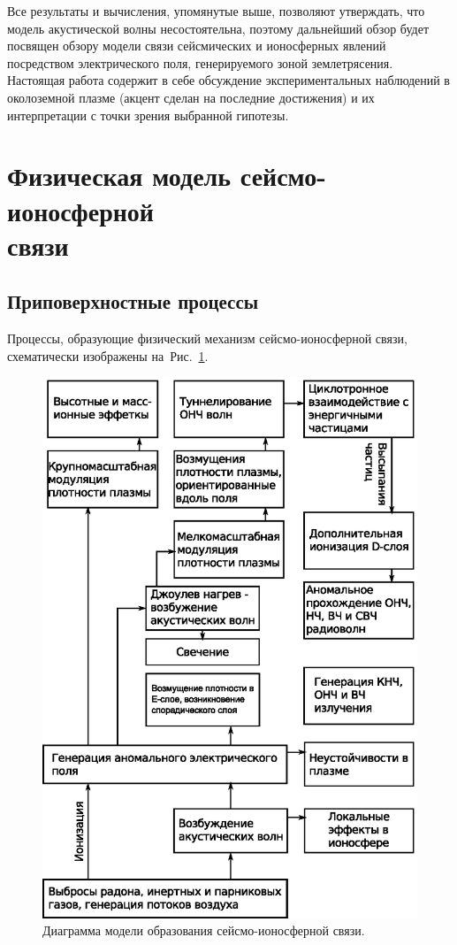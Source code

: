 \documentclass[12pt, oneside, a4paper]{article}
\begin{document}
Все результаты и вычисления, упомянутые выше, позволяют утверждать, что модель акустической волны несостоятельна, поэтому дальнейший обзор будет посвящен обзору модели связи сейсмических и ионосферных явлений посредством электрического поля, генерируемого зоной землетрясения. Настоящая работа содержит в себе обсуждение экспериментальных наблюдений в околоземной плазме (акцент сделан на последние достижения) и их интерпретации с точки зрения выбранной гипотезы.

\section{Физическая модель сейсмо-ионосферной\\связи}
\subsection{Приповерхностные процессы}
Процессы, образующие физический механизм сейсмо-ионосферной связи, схематически изображены на~\mbox{Рис. \ref{fig:process-chain}}. 
\begin{figure}[H]
    \centering
    \includegraphics*[width=0.8\columnwidth]{process-chain}
    \caption{Диаграмма модели образования сейсмо-ионосферной связи.}
    \label{fig:process-chain}
\end{figure}
\end{document}
